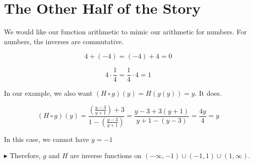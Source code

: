 \documentclass{ximera}
\begin{document}
\section{The Other Half of the Story}


We would like our function arithmetic to mimic our arithmetic for numbers.  For numbers, the inverses are commutative.

\[
4 + (-4) = (-4) + 4 = 0
\]


\[
4 \cdot \frac{1}{4} = \frac{1}{4} \cdot 4 = 1
\]



In our example, we also want $(H \circ g)(y) = H(g(y)) = y$. It does.


\[
(H \circ g)(y) = \frac{\left( \frac{y-3}{y+1} \right) + 3}{1 - \left(  \frac{y-3}{y+1}\right)} = \frac{y-3 + 3(y+1)}{y+1-(y-3)} = \frac{4y}{4} = y
\]


In this case, we cannot have $y = -1$






$\blacktriangleright$  Therefore, $g$ and $H$ are inverse functions on $(-\infty, -1) \cup (-1, 1) \cup (1, \infty)$.
\end{document}
